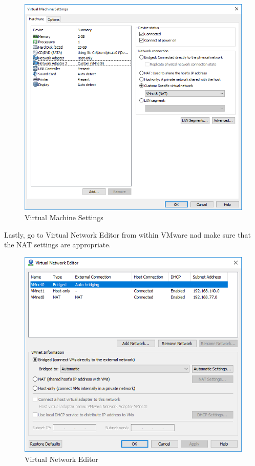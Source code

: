 \documentclass[book,a4paper,12pt]{memoir}
\begin{document}
\begin{figure}[h!]
	\centering
	\includegraphics[scale=0.6]{VirtualMachineSettings}
	\caption{Virtual Machine Settings}
	\label{VMSettings}
\end{figure}

Lastly, go to Virtual Network Editor from within VMware nad make sure that the NAT settings are appropriate.

\begin{figure}[h!]
	\centering
	\includegraphics[scale=0.7]{VirtualNetworkEditor}
	\caption{Virtual Network Editor}
	\label{VMEditor}
\end{figure}
\end{document}
